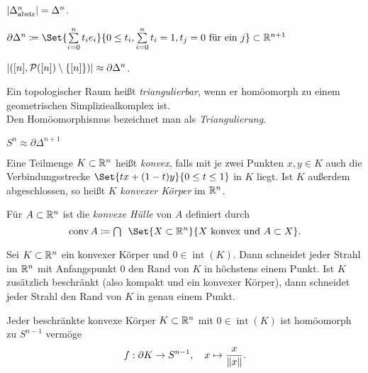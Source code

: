 \documentclass{cheat-sheet}
\newcommand{\inte}{\mathop{\mathrm{int}}} %
\newcommand{\conv}{\mathop{\mathrm{conv}}} %
\begin{document}
\begin{prop}
  $\lvert\Delta^n_{\text{abstr}}\rvert = \Delta^n$.
\end{prop}


\begin{defn}
  $\partial \Delta^n \coloneqq \Set{ \sum_{i=0}^n t_i e_i }{ 0 \leq t_i, \sum_{i=0}^n t_i = 1, t_j = 0 \text{ für ein } j } \subset \R^{n+1}$
\end{defn}

\begin{prop}
  $\lvert([n], \mathcal{P}([n]) \setminus \{ [n] \})\rvert \approx \partial \Delta^n$.
\end{prop}

\begin{defn}
  Ein topologischer Raum heißt \emph{triangulierbar}, wenn er homöomorph zu einem geometrischen Simpliziealkomplex ist.\\
  Den Homöomorphismus bezeichnet man als \emph{Triangulierung}.
\end{defn}

\begin{bsp}
  $S^n \approx \partial \Delta^{n+1}$
\end{bsp}

\begin{defn}
  Eine Teilmenge $K \subset \mathbb{R}^n$ heißt \emph{konvex}, falls mit je zwei Punkten $x, y \in K$ auch die Verbindungsstrecke $\Set{tx + (1-t)y}{ 0 \leq t \leq 1 }$ in $K$ liegt. Ist $K$ außerdem abgeschlossen, so heißt $K$ \emph{konvexer Körper} im $\mathbb{R}^n$.
\end{defn}

\begin{defn}
  Für $A \subset \mathbb{R}^n$ ist die \emph{konvexe Hülle} von $A$ definiert durch
  \[ \conv A \coloneqq \bigcap \enspace \Set{X \subset \R^n}{X \text{ konvex und } A \subset X}. \]
\end{defn}

\begin{prop}
  Sei $K \subset \mathbb{R}^n$ ein konvexer Körper und $0 \in \inte(K)$. Dann schneidet jeder Strahl im $\mathbb{R}^n$ mit Anfangspunkt $0$ den Rand von $K$ in höchstens einem Punkt. Ist $K$ zusätzlich beschränkt (also kompakt und ein konvexer Körper), dann schneidet jeder Strahl den Rand von $K$ in genau einem Punkt.
\end{prop}

\begin{prop}
  Jeder beschränkte konvexe Körper $K \subset \mathbb{R}^n$ mit $0 \in \inte(K)$ ist homöomorph zu $S^{n-1}$ vermöge
  \[ f : \partial K \to S^{n-1}, \quad x \mapsto \frac{x}{\lVert x\rVert}. \]
\end{prop}
\end{document}
